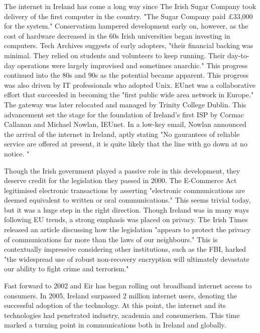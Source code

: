 The internet in Ireland has come a long way since The Irish Sugar Company took delivery of the first computer in the country. "The Sugar Company paid £33,000 for the system." \cite{irelands_first_computers} Conservatism hampered development early on, however, as the cost of hardware decreased in the 60s Irish universities began investing in computers. Tech Archives suggests of early adopters, "their financial backing was minimal. They relied on students and volunteers to keep running. Their day-to-day operations were largely improvised and sometimes anarchic." \cite{internet_ireland_1987_97} This progress continued into the 80s and 90s as the potential became apparent. This progress was also driven by IT professionals who adopted Unix. EUnet was a collaborative effort that succeeded in becoming the "first public wide area network in Europe." \cite{internet_ireland_1987_97} The gateway was later relocated and managed by Trinity College Dublin. This advancement set the stage for the foundation of Ireland's first ISP by Cormac Callanan and Michael Nowlan, IEUnet. In a low-key email, Nowlan announced the arrival of the internet in Ireland, aptly stating "No gaurantees of reliable service are offered at present, it is quite likely that the line with go down at no notice. " \cite{tcd_scss_t_20160323_001} 

Though the Irish government played a passive role in this development, they deserve credit for the legislation they passed in 2000. The E-Commerce Act legitimised electronic transactions by asserting "electronic communications are deemed equivalent to written or oral communications." \cite{electronic_documents_legalguide} This seems trivial today, but it was a huge step in the right direction. Though Ireland was in many ways following EU trends, a strong emphasis was placed on privacy. The Irish Times released an article discussing how the legislation "appears to protect the privacy of communications far more than the laws of our neighbours." \cite{irishtimes_privacy_legislation} This is contextually impressive considering other institutions, such as the FBI, harked "the widespread use of robust non-recovery encryption will ultimately devastate our ability to fight crime and terrorism." \cite{irishtimes_privacy_legislation} 

Fast forward to 2002 and Eir has began rolling out broadband internet access to consumers. In 2005, Ireland surpassed 2 million internet users, denoting the successful adoption of the technology. At this point, the internet and its technologies had penetrated industry, academia and consumerism. This time marked a turning point in communications both in Ireland and globally.

